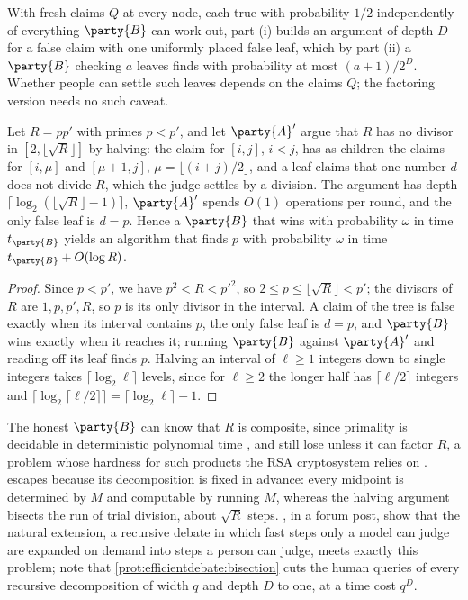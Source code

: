 \begin{refsection}
With fresh claims $Q$ at every node, each true with probability $1/2$ independently of everything $\party{B}$ can work out, part (i) builds an argument of depth $D$ for a false claim with one uniformly placed false leaf, which by part (ii) a $\party{B}$ checking $a$ leaves finds with probability at most $(a+1)/2^D$. Whether people can settle such leaves depends on the claims $Q$; the factoring version needs no such caveat.

\begin{proposition}\label{prop:efficientdebate:factoring}
Let $R=pp'$ with primes $p<p'$, and let $\party{A}'$ argue that $R$ has no divisor in $[2,\lfloor\sqrt R\rfloor]$ by halving: the claim for $[i,j]$, $i<j$, has as children the claims for $[i,\mu]$ and $[\mu+1,j]$, $\mu=\lfloor(i+j)/2\rfloor$, and a leaf claims that one number $d$ does not divide $R$, which the judge settles by a division. The argument has depth $\lceil\log_2(\lfloor\sqrt R\rfloor-1)\rceil$, $\party{A}'$ spends $O(1)$ operations per round, and the only false leaf is $d=p$. Hence a $\party{B}$ that wins with probability $\omega$ in time $t_{\party{B}}$ yields an algorithm that finds $p$ with probability $\omega$ in time $t_{\party{B}}+O(\log R)$.
\end{proposition}

\begin{proof}
Since $p<p'$, we have $p^2<R<p'^2$, so $2\le p\le\lfloor\sqrt R\rfloor<p'$; the divisors of $R$ are $1,p,p',R$, so $p$ is its only divisor in the interval. A claim of the tree is false exactly when its interval contains $p$, the only false leaf is $d=p$, and $\party{B}$ wins exactly when it reaches it; running $\party{B}$ against $\party{A}'$ and reading off its leaf finds $p$. Halving an interval of $\ell\ge1$ integers down to single integers takes $\lceil\log_2\ell\rceil$ levels, since for $\ell\ge2$ the longer half has $\lceil\ell/2\rceil$ integers and $\lceil\log_2\lceil\ell/2\rceil\rceil=\lceil\log_2\ell\rceil-1$.
\end{proof}

The honest $\party{B}$ can know that $R$ is composite, since primality is decidable in deterministic polynomial time \parencite{AgrawalKayalSaxena2004}, and still lose unless it can factor $R$, a problem whose hardness for such products the RSA cryptosystem relies on \parencite{RivestShamirAdleman1978}.  escapes because its decomposition is fixed in advance: every midpoint is determined by $M$ and computable by running $M$, whereas the halving argument bisects the run of trial division, about $\sqrt R$ steps. \Textcite{BrownCohenIrving2024}, in a forum post, show that the natural extension, a recursive debate in which fast steps only a model can judge are expanded on demand into steps a person can judge, meets exactly this problem; \textcite{LiEtAl2026} note that \cref{prot:efficientdebate:bisection} cuts the human queries of every recursive decomposition of width $q$ and depth $D$ to one, at a time cost $q^D$.


\end{refsection}
